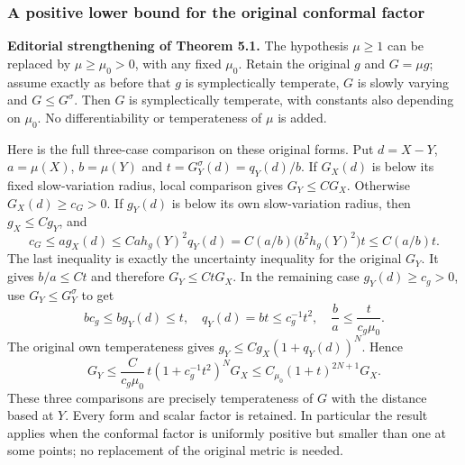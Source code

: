 \documentclass[
  11pt,
]{article}
\begin{document}
\subsubsection{A positive lower bound for the original conformal
factor}\label{a-positive-lower-bound-for-the-original-conformal-factor}

\textbf{Editorial strengthening of Theorem 5.1.} The hypothesis
\(\mu\ge1\) can be replaced by \(\mu\ge\mu_0>0\), with any fixed
\(\mu_0\). Retain the original \(g\) and \(G=\mu g\); assume exactly as
before that \(g\) is symplectically temperate, \(G\) is slowly varying
and \(G\le G^\sigma\). Then \(G\) is symplectically temperate, with
constants also depending on \(\mu_0\). No differentiability or
temperateness of \(\mu\) is added.

Here is the full three-case comparison on these original forms. Put
\(d=X-Y\), \(a=\mu(X)\), \(b=\mu(Y)\) and \(t=G_Y^\sigma(d)=q_Y(d)/b\).
If \(G_X(d)\) is below its fixed slow-variation radius, local comparison
gives \(G_Y\le C G_X\). Otherwise \(G_X(d)\ge c_G>0\). If \(g_Y(d)\) is
below its own slow-variation radius, then \(g_X\le Cg_Y\), and \[
 c_G\le a g_X(d)\le C a h_g(Y)^2q_Y(d)
       =C(a/b)\big(b^2h_g(Y)^2\big)t\le C(a/b)t.
 \tag{A56}
\] The last inequality is exactly the uncertainty inequality for the
original \(G_Y\). It gives \(b/a\le Ct\) and therefore \(G_Y\le CtG_X\).
In the remaining case \(g_Y(d)\ge c_g>0\), use \(G_Y\le G_Y^\sigma\) to
get \[
 b c_g\le b g_Y(d)\le t,\quad
 q_Y(d)=bt\le c_g^{-1}t^2,\quad
 \frac ba\le\frac{t}{c_g\mu_0}.
 \tag{A57}
\] The original own temperateness gives \(g_Y\le Cg_X(1+q_Y(d))^N\).
Hence \[
 G_Y\le \frac{C}{c_g\mu_0}\,
             t(1+c_g^{-1}t^2)^N G_X
       \le C_{\mu_0}(1+t)^{2N+1}G_X.
 \tag{A58}
\] These three comparisons are precisely temperateness of \(G\) with the
distance based at \(Y\). Every form and scalar factor is retained. In
particular the result applies when the conformal factor is uniformly
positive but smaller than one at some points; no replacement of the
original metric is needed.
\end{document}
